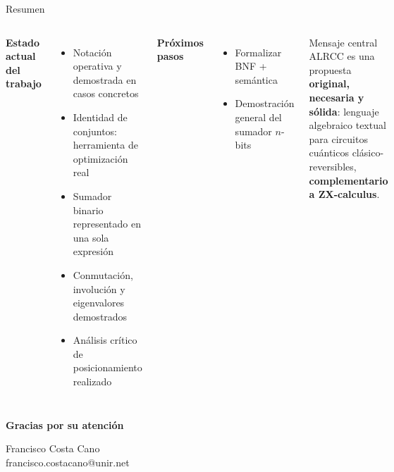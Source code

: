 \documentclass[12pt, aspectratio=169]{beamer}
\newcommand{\yes}{\textcolor{alrcc-green}{$\checkmark$}}
\begin{document}
\begin{frame}{Resumen}
  \begin{columns}[T]
    \textbf{Estado actual del trabajo}
    \begin{itemize}\small
      \item[\yes] Notación operativa y demostrada en casos concretos
      \item[\yes] Identidad de conjuntos: herramienta de optimización real
      \item[\yes] Sumador binario representado en una sola expresión
      \item[\yes] Conmutación, involución y eigenvalores demostrados
      \item[\yes] Análisis crítico de posicionamiento realizado
    \end{itemize}

    \textbf{Próximos pasos}
    \begin{itemize}\small
      \item[\textbf{1.}] Formalizar BNF + semántica
      \item[\textbf{2.}] Demostración general del sumador $n$-bits
    \end{itemize}

    \begin{block}{Mensaje central}
      \small
      ALRCC es una propuesta \textbf{original, necesaria y sólida}: lenguaje algebraico textual para circuitos cuánticos
      clásico-reversibles, \textbf{complementario a ZX-calculus}.
    \end{block}
  \end{columns}
\end{frame}

{
\begin{frame}[noframenumbering]
  \centering
  \vspace{1.5cm}
  {\Large \textbf{Gracias por su atención}}

  \vspace{0.8cm}
  {\large Francisco Costa Cano}\\[0.3cm]
  {\normalsize francisco.costacano@unir.net}
\end{frame}
}
\end{document}
